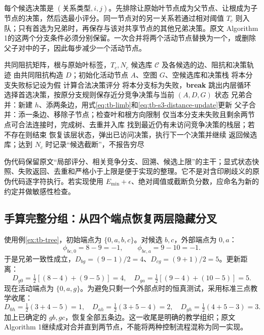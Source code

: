 \documentclass[UTF8,11pt,fontset=fandol,openany,oneside]{ctexbook}
\theoremstyle{definition}
\theoremstyle{remark}
\numberwithin{equation}{chapter}
\begin{document}
每个候选决策是 $(\text{关系类型},i,j)$。先排除让原始叶节点成为父节点、让根成为子节点的决策，然后选最小评分。同一节点对的另一关系若通过相对阈值 $T_c$ 则入队；只有首选为兄弟时，再保存与该对共享节点的其他兄弟决策。原文 Algorithm 1的这两个分支条件必须分别保留。一次合并将两个活动节点替换为一个，或删除父子对中的子，因此每步减少一个活动节点。

\begin{algorithm}[htbp]
\caption{S3：回溯分组的状态级重述（平均、方向及零值约定须显式记录）}
\begin{algorithmic}[1]
\Require 共同阻抗矩阵，根与原始叶标签，$T_c,N_c$
\Ensure 候选库 $\mathcal C$ 及各候选的边、阻抗和决策轨迹
\State 由共同阻抗构造 $D$；初始化活动节点 $A$、空图 $G$、空候选库和决策栈
\State 将本分支失败标记设为假
\State 计算合法决策评分
\State 将本分支标为失败，\textbf{break} 跳出内层循环
\EndIf
\State 选择首选决策，按原分支规则保存近分竞争决策与当前 $(A,D,G)$ 状态
\State 兄弟合并：新建 $h$、添两条边，用式\eqref{eq:tb-limb}和\eqref{eq:tb-s3-distance-update}更新
\State 父子合并：添一条边、移除子节点；检查叶和根方向限制
\EndWhile
\State 仅当本分支未失败且剩余两节点可合法连接时，完成树、去重并入库
\State 找到最近仍有未访问竞争决策的栈层；若不存在则结束
\State 恢复该层状态，弹出已访问决策，执行下一个决策并继续
\EndWhile
\State 返回候选库；达到 $N_c$ 时记录“候选截断”，不报告穷尽
\end{algorithmic}
\end{algorithm}
伪代码保留原文“局部评分、相关竞争分支、回溯、候选上限”的主干；显式状态快照、失败返回、去重和严格小于上限是便于实现的整理。它不是对含印刷歧义的原伪代码逐字符执行。若实现使用 $E_{\min}+\epsilon$、绝对阈值或截断负分数，应命名为新的约定并做敏感性检查。

\subsection{手算完整分组：从四个端点恢复两层隐藏分叉}
使用例\ref{ex:tb-tree}，初始端点为 $\{0,a,b,c\}$。对候选 $b,c$，外部端点为 $0,a$：
\begin{equation}
 \phi_{bc,0}=8-9=-1,\qquad \phi_{bc,a}=9-10=-1.
\end{equation}
于是兄弟一致性成立，$D_{bg}=(9-1)/2=4$、$D_{cg}=(9+1)/2=5$。更新距离：
\begin{equation}
 D_{g0}=\tfrac12[(8-4)+(9-5)]=4,\quad
 D_{ga}=\tfrac12[(9-4)+(10-5)]=5.
\end{equation}
现在活动端点为 $\{0,a,g\}$。为避免只剩一个外部点时的恒真测试，采用标准三点教学收尾：
\begin{equation}
 D_{0h}=\tfrac12(3+4-5)=1,\quad
 D_{ah}=\tfrac12(3+5-4)=2,\quad
 D_{gh}=\tfrac12(4+5-3)=3.
\end{equation}
加上已确定的 $gb,gc$，恢复全部五条边。这一收尾是明确的教学组织；原文 Algorithm 1继续成对合并直到两节点，不能将两种控制流程混称为同一实现。
\end{document}
